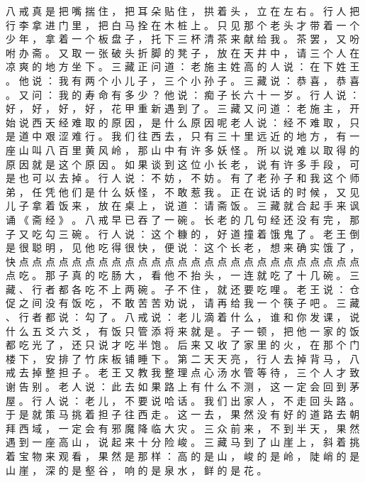 {八 戒 真 是 把 嘴 揣 住 ， 把 耳 朵 贴 住 ， 拱 着 头 ， 立 在 左 右 。
行 人 把 行 李 拿 进 门 里 ， 把 白 马 拴 在 木 桩 上 。
只 见 那 个 老 头 才 带 着 一 个 少 年 ， 拿 着 一 个 板 盘 子 ， 托 下 三 杯 清 茶 来 献 给 我 。
茶 罢 ， 又 吩 咐 办 斋 。
又 取 一 张 破 头 折 脚 的 凳 子 ， 放 在 天 井 中 ， 请 三 个 人 在 凉 爽 的 地 方 坐 下 。
三 藏 正 问 道 ： 老 施 主 姓 高 的 人 说 ： 在 下 姓 王 。
他 说 ： 我 有 两 个 小 儿 子 ， 三 个 小 孙 子 。
三 藏 说 ： 恭 喜 ， 恭 喜 。
又 问 ： 我 的 寿 命 有 多 少 ？ 他 说 ： 痴 子 长 六 十 一 岁 。
行 人 说 ： 好 ， 好 ， 好 ， 好 ， 花 甲 重 新 遇 到 了 。
三 藏 又 问 道 ： 老 施 主 ， 开 始 说 西 天 经 难 取 的 原 因 ， 是 什 么 原 因 呢 老 人 说 ： 经 不 难 取 ， 只 是 道 中 艰 涩 难 行 。
我 们 往 西 去 ， 只 有 三 十 里 远 近 的 地 方 ， 有 一 座 山 叫 八 百 里 黄 风 岭 ， 那 山 中 有 许 多 妖 怪 。
所 以 说 难 以 取 得 的 原 因 就 是 这 个 原 因 。
如 果 谈 到 这 位 小 长 老 ， 说 有 许 多 手 段 ， 可 是 也 可 以 去 掉 。
行 人 说 ： 不 妨 ， 不 妨 。
有 了 老 孙 子 和 我 这 个 师 弟 ， 任 凭 他 们 是 什 么 妖 怪 ， 不 敢 惹 我 。
正 在 说 话 的 时 候 ， 又 见 儿 子 拿 着 饭 来 ， 放 在 桌 上 ， 说 道 ： 请 斋 饭 。
三 藏 就 合 起 手 来 讽 诵 《 斋 经 》 。
八 戒 早 已 吞 了 一 碗 。
长 老 的 几 句 经 还 没 有 完 ， 那 子 又 吃 勾 三 碗 。
行 人 说 ： 这 个 糠 的 ， 好 道 撞 着 饿 鬼 了 。
老 王 倒 是 很 聪 明 ， 见 他 吃 得 很 快 ， 便 说 ： 这 个 长 老 ， 想 来 确 实 饿 了 ， 快 点 点 点 点 点 点 点 点 点 点 点 点 点 点 点 点 点 点 点 点 点 点 点 点 点 点 点 吃 。
那 子 真 的 吃 肠 大 ， 看 他 不 抬 头 ， 一 连 就 吃 了 十 几 碗 。
三 藏 、 行 者 都 各 吃 不 上 两 碗 。
子 不 住 ， 就 还 要 吃 哩 。
老 王 说 ： 仓 促 之 间 没 有 饭 吃 ， 不 敢 苦 苦 劝 说 ， 请 再 给 我 一 个 筷 子 吧 。
三 藏 、 行 者 都 说 ： 勾 了 。
八 戒 说 ： 老 儿 滴 着 什 么 ， 谁 和 你 发 课 ， 说 什 么 五 爻 六 爻 ， 有 饭 只 管 添 将 来 就 是 。
子 一 顿 ， 把 他 一 家 的 饭 都 吃 光 了 ， 还 只 说 才 吃 半 饱 。
后 来 又 收 了 家 里 的 火 ， 在 那 个 门 楼 下 ， 安 排 了 竹 床 板 铺 睡 下 。
第 二 天 天 亮 ， 行 人 去 掉 背 马 ， 八 戒 去 掉 整 担 子 。
老 王 又 教 我 整 理 点 心 汤 水 管 等 待 ， 三 个 人 才 致 谢 告 别 。
老 人 说 ： 此 去 如 果 路 上 有 什 么 不 测 ， 这 一 定 会 回 到 茅 屋 。
行 人 说 ： 老 儿 ， 不 要 说 哈 话 。
我 们 出 家 人 ， 不 走 回 头 路 。
于 是 就 策 马 挑 着 担 子 往 西 走 。
这 一 去 ， 果 然 没 有 好 的 道 路 去 朝 拜 西 域 ， 一 定 会 有 邪 魔 降 临 大 灾 。
三 众 前 来 ， 不 到 半 天 ， 果 然 遇 到 一 座 高 山 ， 说 起 来 十 分 险 峻 。
三 藏 马 到 了 山 崖 上 ， 斜 着 挑 着 宝 物 来 观 看 ， 果 然 是 那 样 ： 高 的 是 山 ， 峻 的 是 岭 ， 陡 峭 的 是 山 崖 ， 深 的 是 壑 谷 ， 响 的 是 泉 水 ， 鲜 的 是 花 。
}
